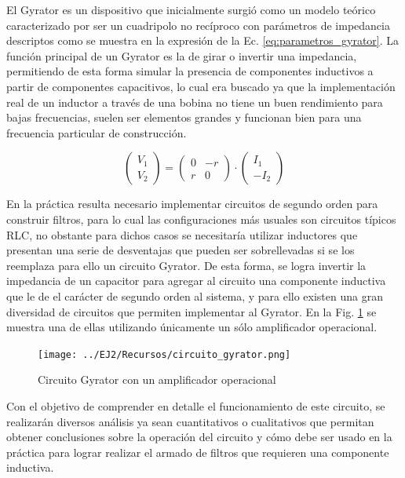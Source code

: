 El Gyrator es un dispositivo que inicialmente surgi\'o como un modelo te\'orico caracterizado por ser un cuadripolo no rec\'iproco con par\'ametros de impedancia
descriptos como se muestra en la expresi\'on de la Ec. \ref{eq:parametros_gyrator}. La funci\'on principal de un Gyrator es la de girar o invertir una impedancia, permitiendo
de esta forma simular la presencia de componentes inductivos a partir de componentes capacitivos, lo cual era buscado ya que la implementaci\'on real de un inductor a trav\'es de una bobina
no tiene un buen rendimiento para bajas frecuencias, suelen ser elementos grandes y funcionan bien para una frecuencia particular de construcci\'on.

\begin{equation*}
    \begin{pmatrix}
        V_1 \\ V_2
    \end{pmatrix}
    =
    \begin{pmatrix}
        0 & -r \\
        r & 0
    \end{pmatrix}
    \cdot 
    \begin{pmatrix}
        I_1 \\ -I_2
    \end{pmatrix}
    \label{eq:parametros_gyrator}
\end{equation*}

En la pr\'actica resulta necesario implementar circuitos de segundo orden para construir filtros, para lo cual las configuraciones m\'as usuales son circuitos
t\'ipicos RLC, no obstante para dichos casos se necesitar\'ia utilizar inductores que presentan una serie de desventajas que pueden ser sobrellevadas si se los reemplaza para ello un circuito Gyrator.
De esta forma, se logra invertir la impedancia de un capacitor para agregar al circuito una componente inductiva que le de el car\'acter de segundo orden al sistema, y para ello existen una gran diversidad
de circuitos que permiten implementar al Gyrator. En la Fig. \ref{fig:circuito_gyrator} se muestra una de ellas utilizando \'unicamente un s\'olo amplificador operacional.

\begin{figure}[H]
    \centering
    \texttt{[image: ../EJ2/Recursos/circuito\_gyrator.png]}
    \caption{Circuito Gyrator con un amplificador operacional}
    \label{fig:circuito_gyrator}
\end{figure}

Con el objetivo de comprender en detalle el funcionamiento de este circuito, se realizar\'an diversos an\'alisis ya sean cuantitativos o cualitativos que permitan
obtener conclusiones sobre la operaci\'on del circuito y c\'omo debe ser usado en la pr\'actica para lograr realizar el armado de filtros que requieren una componente inductiva.

